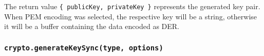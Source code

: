 \begin{Shaded}
\begin{Highlighting}[]
\NormalTok{ \{}
\OperatorTok{,}
\NormalTok{\} }\OperatorTok{=} \NormalTok{(}\NormalTok{)}\OperatorTok{;}

\NormalTok{ \{}
\OperatorTok{,}
\OperatorTok{,}
\NormalTok{\} }\OperatorTok{=} \NormalTok{(}\OperatorTok{,}\NormalTok{ \{}
  \OperatorTok{:} \OperatorTok{,}
  \OperatorTok{:}\NormalTok{ \{}
    \OperatorTok{:} \OperatorTok{,}
    \OperatorTok{:} \OperatorTok{,}
\NormalTok{  \}}\OperatorTok{,}
  \OperatorTok{:}\NormalTok{ \{}
    \OperatorTok{:} \OperatorTok{,}
    \OperatorTok{:} \OperatorTok{,}
    \OperatorTok{:} \OperatorTok{,}
    \OperatorTok{:} \OperatorTok{,}
\NormalTok{  \}}\OperatorTok{,}
\NormalTok{\})}\OperatorTok{;}
\end{Highlighting}
\end{Shaded}

The return value \texttt{\{\ publicKey,\ privateKey\ \}} represents the
generated key pair. When PEM encoding was selected, the respective key
will be a string, otherwise it will be a buffer containing the data
encoded as DER.

\subsubsection{\texorpdfstring{\texttt{crypto.generateKeySync(type,\ options)}}{crypto.generateKeySync(type, options)}}\label{crypto.generatekeysynctype-options}

